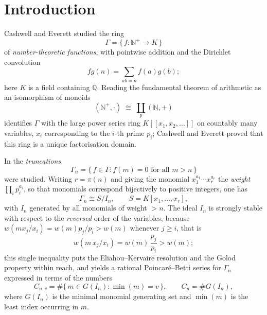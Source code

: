 \documentclass[a4paper,11pt,oneside,reqno]{amsart}
\theoremstyle{definition}
\theoremstyle{remark}
\theoremstyle{plain}
\newcommand{\NN}{\mathbb{N}}
\newcommand{\QQ}{\mathbb{Q}}
\newcommand{\Gam}{\Gamma}
\begin{document}
\section{Introduction}

Cashwell and Everett \cite{CashwellEverett} studied the ring
\begin{equation}
  \Gam = \{\,f \colon \NN^+\to K\,\}
\end{equation}
of \emph{number-theoretic functions}, with pointwise addition and the Dirichlet
convolution
\begin{equation}
  fg(n) = \sum_{ab = n}f(a)g(b);
\end{equation}
here \(K\) is a field containing \(\QQ\). Reading the fundamental theorem of
arithmetic as an isomorphism of monoids
\begin{equation}\label{eq:monoid}
  (\NN^+,\cdot)\;\cong \;\coprod_{p}(\NN,+)
\end{equation}
identifies \(\Gam\) with the large power series ring \(K[[x_1,x_2,\dots]]\) on
countably many variables, \(x_i\) corresponding to the \(i\)-th prime \(p_i\);
Cashwell and Everett proved that this ring is a unique factorisation domain.

In \cite{Snellman2000} the \emph{truncations}
\begin{equation}
  \Gam_n = \{\,f \in \Gam : f(m) = 0\text{ for all }m > n\,\}
\end{equation}
were studied. Writing \(r = \pi(n)\) and giving the monomial
\(x_1^{a_1}\cdots x_r^{a_r}\) the \emph{weight} \(\prod_i p_i^{a_i}\), so that
monomials correspond bijectively to positive integers, one has
\begin{equation}\label{eq:GammaSI}
  \Gam_n \cong S/I_n,\qquad S = K[x_1,\dots,x_r],
\end{equation}
with \(I_n\) generated by all
monomials of weight \(>n\). The ideal \(I_n\) is strongly stable with respect to
the \emph{reversed} order of the variables, because
\(w(mx_j/x_i) = w(m)p_j/p_i > w(m)\) whenever \(j \ge i\), that is
\begin{equation}\label{eq:stable}
  w\!\left(m\,x_j/x_i\right) = w(m)\,\frac{p_j}{p_i} > w(m);
\end{equation}
this single inequality
puts the Eliahou--Kervaire resolution \cite{EliahouKervaire} and the Golod
property \cite{AramovaHerzog,Peeva,Golod,GulliksenLevin} within reach, and
yields a rational Poincaré--Betti series for \(\Gam_n\) expressed in terms of
the numbers
\begin{equation}\label{eq:Cdef}
  C_{n,v} = \#\{\,m \in G(I_n) : \min(m) = v\,\},\qquad C_n = \#G(I_n),
\end{equation}
where \(G(I_n)\) is the minimal monomial generating set and \(\min(m)\) is the
least index occurring in \(m\).
\end{document}
